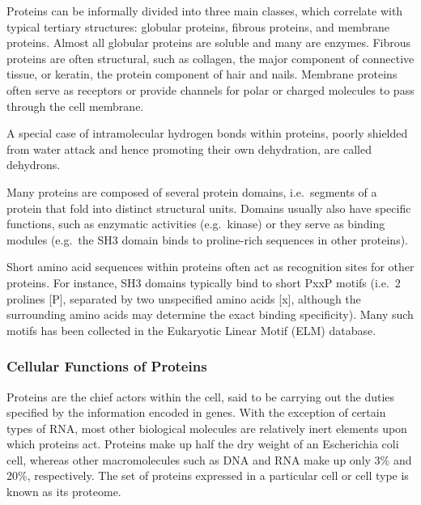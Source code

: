 Proteins can be informally divided into three main classes, which
correlate with typical tertiary structures: globular proteins, fibrous
proteins, and membrane proteins. Almost all globular proteins are
soluble and many are enzymes. Fibrous proteins are often structural,
such as collagen, the major component of connective tissue, or keratin,
the protein component of hair and nails. Membrane proteins often serve
as receptors or provide channels for polar or charged molecules to pass
through the cell membrane.

A special case of intramolecular hydrogen bonds within proteins, poorly
shielded from water attack and hence promoting their own dehydration,
are called dehydrons.

Many proteins are composed of several protein domains, i.e.~segments of
a protein that fold into distinct structural units. Domains usually also
have specific functions, such as enzymatic activities (e.g.~kinase) or
they serve as binding modules (e.g.~the SH3 domain binds to proline-rich
sequences in other proteins).

Short amino acid sequences within proteins often act as recognition
sites for other proteins. For instance, SH3 domains typically bind to
short PxxP motifs (i.e.~2 prolines {[}P{]}, separated by two unspecified
amino acids {[}x{]}, although the surrounding amino acids may determine
the exact binding specificity). Many such motifs has been collected in
the Eukaryotic Linear Motif (ELM) database.

\hypertarget{cellular-functions-of-proteins}{%
\subsubsection{Cellular Functions of
Proteins}\label{cellular-functions-of-proteins}}

Proteins are the chief actors within the cell, said to be carrying out
the duties specified by the information encoded in genes. With the
exception of certain types of RNA, most other biological molecules are
relatively inert elements upon which proteins act. Proteins make up half
the dry weight of an Escherichia coli cell, whereas other macromolecules
such as DNA and RNA make up only 3\% and 20\%, respectively. The set of
proteins expressed in a particular cell or cell type is known as its
proteome.

